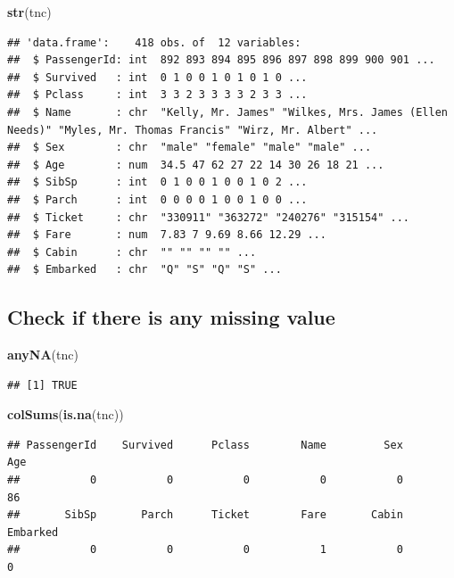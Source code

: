 \documentclass[
]{article}
\newenvironment{Shaded}{\begin{snugshade}}{\end{snugshade}}
\newcommand{\FunctionTok}[1]{\textcolor[rgb]{1.00,0.58,0.35}{\textbf{#1}}}
\newcommand{\NormalTok}[1]{\textcolor[rgb]{0.74,0.68,0.62}{#1}}
\begin{document}
\begin{Shaded}
\begin{Highlighting}[]
\FunctionTok{str}\NormalTok{(tnc)}
\end{Highlighting}
\end{Shaded}

\begin{verbatim}
## 'data.frame':    418 obs. of  12 variables:
##  $ PassengerId: int  892 893 894 895 896 897 898 899 900 901 ...
##  $ Survived   : int  0 1 0 0 1 0 1 0 1 0 ...
##  $ Pclass     : int  3 3 2 3 3 3 3 2 3 3 ...
##  $ Name       : chr  "Kelly, Mr. James" "Wilkes, Mrs. James (Ellen Needs)" "Myles, Mr. Thomas Francis" "Wirz, Mr. Albert" ...
##  $ Sex        : chr  "male" "female" "male" "male" ...
##  $ Age        : num  34.5 47 62 27 22 14 30 26 18 21 ...
##  $ SibSp      : int  0 1 0 0 1 0 0 1 0 2 ...
##  $ Parch      : int  0 0 0 0 1 0 0 1 0 0 ...
##  $ Ticket     : chr  "330911" "363272" "240276" "315154" ...
##  $ Fare       : num  7.83 7 9.69 8.66 12.29 ...
##  $ Cabin      : chr  "" "" "" "" ...
##  $ Embarked   : chr  "Q" "S" "Q" "S" ...
\end{verbatim}

\hypertarget{check-if-there-is-any-missing-value}{%
\subsection{Check if there is any missing
value}\label{check-if-there-is-any-missing-value}}

\begin{Shaded}
\begin{Highlighting}[]
\FunctionTok{anyNA}\NormalTok{(tnc)}
\end{Highlighting}
\end{Shaded}

\begin{verbatim}
## [1] TRUE
\end{verbatim}

\begin{Shaded}
\begin{Highlighting}[]
\FunctionTok{colSums}\NormalTok{(}\FunctionTok{is.na}\NormalTok{(tnc))}
\end{Highlighting}
\end{Shaded}

\begin{verbatim}
## PassengerId    Survived      Pclass        Name         Sex         Age 
##           0           0           0           0           0          86 
##       SibSp       Parch      Ticket        Fare       Cabin    Embarked 
##           0           0           0           1           0           0
\end{verbatim}
\end{document}
